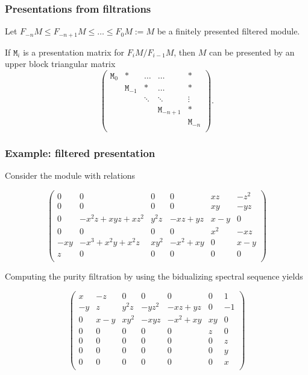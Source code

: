 \begin{frame}
 \frametitle{Presentations from filtrations}
 Let $F_{-n} M \leq F_{-n+1} M \leq \dots \leq F_0 M := M$ be a finitely presented filtered module. \pause
 \begin{block}{}
  If $\mathtt{M}_i$ is a presentation matrix for $F_i M / F_{i-1}M$, \pause then $M$ can be presented by
  an upper block triangular matrix
  \[
   \left( \begin{array}{ccccc}
           \mathtt{M}_0 & * & \dots & \dots & * \\
           & \mathtt{M}_{-1} & * & \dots & * \\
           & & \ddots & \ddots & \vdots \\
           & & & \mathtt{M}_{-n+1} & * \\
           & & & & \mathtt{M}_{-n} \\
          \end{array} \right).
  \]
 \end{block}

\end{frame}

\begin{frame}[fragile]
 \frametitle{Example: filtered presentation}
 Consider the module with relations
\begin{small}
\[
\left(
  \begin{array}{cccccc}
0&0&                 0&    0&       xz&-z^2 \\   
0&    0&                 0&    0&       xy&-yz\\
0&    -x^2z+xyz+xz^2&y^2z&-xz+yz&x-y&0\\   
0&0&                 0&    0&       x^2&-xz\\
-xy&    -x^3+x^2y+x^2z&  xy^2&-x^2+xy&0&  x-y\\
 z& 0&                 0&    0&       0&  0\\ 
  \end{array}
\right)
\]
\end{small}
\pause Computing the purity filtration by using the bidualizing spectral sequence yields
\begin{small}
\[
 \left(
 \begin{array}{ccccc|c|c}
x& -z& 0&    0&     0&       0&  1\\ 
-y&z&  y^2z&-yz^2&-xz+yz&0&  -1\\
0& x-y&xy^2&-xyz&-x^2+xy&xy&0\\
\hline
0& 0&  0&    0&     0&       z&  0\\ 
\hline
0& 0&  0&    0&     0&       0&  z\\ 
0& 0&  0&    0&     0&       0&  y\\ 
0& 0&  0&    0&     0&       0&  x \\
\end{array} \right)
\]
\end{small}
\end{frame}
